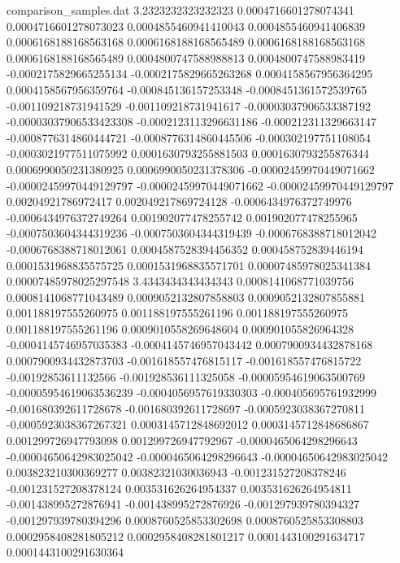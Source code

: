 \begin{filecontents}{comparison_samples.dat}
3.2323232323232323  0.0004716601278074341   0.0004716601278073023   0.0004855460941410043  0.0004855460941406839  0.0006168188168563168  0.0006168188168565489  0.0006168188168563168  0.0006168188168565489  0.0004800747588988813  0.0004800747588983419  -0.0002175829665255134  -0.0002175829665263268  0.0004158567956364295  0.0004158567956359764  -0.000845136157253348   -0.0008451361572539765  -0.001109218731941529   -0.001109218731941617   -0.00003037906533387192 -0.00003037906533423308 -0.0002123113296631186  -0.000212311329663147   -0.0008776314860444721  -0.0008776314860445506  -0.000302197751108054   -0.0003021977511075992  0.0001630793255881503  0.0001630793255876344  0.0006990050231380925  0.0006990050231378306  -0.00002459970449071662 -0.00002459970449129797 -0.00002459970449071662 -0.00002459970449129797 0.00204921786972417    0.002049217869724128   -0.0006434976372749976  -0.0006434976372749264  0.001902077478255742   0.001902077478255965   -0.0007503604344319236  -0.0007503604344319439  -0.0006768388718012042  -0.0006768388718012061  0.0004587528394456352  0.000458752839446194   0.0001531968835575725  0.0001531968835571701  0.00007485978025341384  0.00007485978025297548
3.4343434343434343  0.0008141068771039756   0.0008141068771043489   0.0009052132807858803  0.0009052132807855881  0.001188197555260975   0.001188197555261196   0.001188197555260975   0.001188197555261196   0.0009010558269648604  0.000901055826964328   -0.0004145746957035383  -0.0004145746957043442  0.0007900934432878168  0.0007900934432873703  -0.001618557476815117   -0.001618557476815722   -0.00192853611132566    -0.001928536111325058   -0.00005954619063500769 -0.00005954619063536239 -0.0004056957619330303  -0.000405695761932999   -0.001680392611728678   -0.001680392611728697   -0.0005923038367270811  -0.0005923038367267321  0.0003145712848692012  0.0003145712848686867  0.001299726947793098   0.001299726947792967   -0.0000465064298296643  -0.00004650642983025042 -0.0000465064298296643  -0.00004650642983025042 0.003823210300369277   0.00382321030036943    -0.001231527208378246   -0.001231527208378124   0.003531626264954337   0.003531626264954811   -0.001438995272876941   -0.001438995272876926   -0.001297939780394327   -0.001297939780394296   0.0008760525853302698  0.0008760525853308803  0.0002958408281805212  0.0002958408281801217  0.0001443100291634717   0.0001443100291630364 

\end{filecontents}
